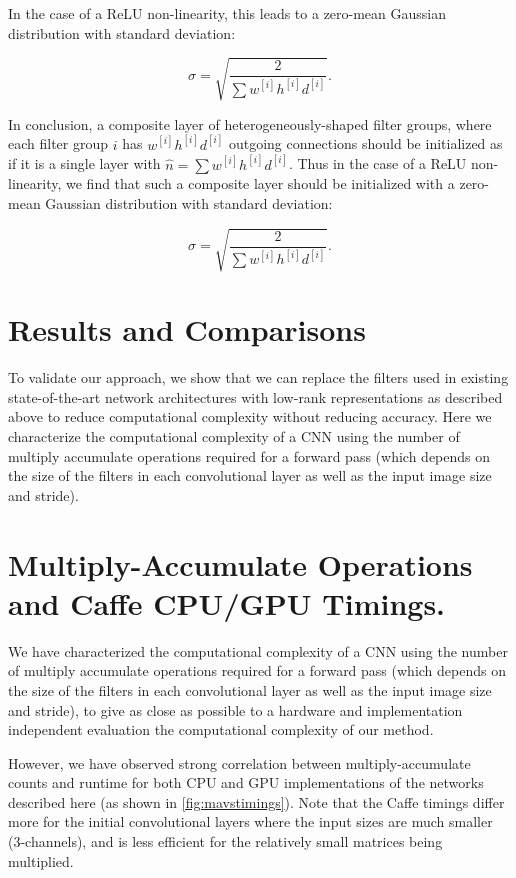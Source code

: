 \documentclass[thesis]{subfiles}
\begin{document}
    In the case of a ReLU non-linearity, this leads to a zero-mean Gaussian distribution with standard deviation:
    
    \begin{equation}
    \sigma = \sqrt{\frac{2}{\sum{ w^{[i]} h^{[i]} d^{[i]}}}}.
    \end{equation}
    
    In conclusion, a composite layer of heterogeneously-shaped filter groups, where each filter group $i$ has $w^{[i]} h^{[i]} d^{[i]}$ outgoing connections should be initialized as if it is a single layer with  $\hat{n} = \sum{ w^{[i]} h^{[i]} d^{[i]}}$. Thus in the case of a ReLU non-linearity, we find that such a composite layer should be initialized with a zero-mean Gaussian distribution with standard deviation:
    
    \begin{equation}
    \sigma = \sqrt{\frac{2}{\sum{ w^{[i]} h^{[i]} d^{[i]}}}}.
    \end{equation}
    
    \section{Results and Comparisons}
    To validate our approach, we show that we can replace the filters used in existing state-of-the-art network architectures with low-rank representations as described above to reduce computational complexity without reducing accuracy. Here we characterize the computational complexity of a CNN using the number of multiply accumulate operations required for a forward pass (which depends on the size of the filters in each convolutional layer as well as the input image size and stride). 
    \section{Multiply-Accumulate Operations and Caffe CPU/GPU Timings.}\label{mavstimings}
    We have characterized the computational complexity of a CNN using the number of multiply accumulate operations required for a forward pass (which depends on the size of the filters in each convolutional layer as well as the input image size and stride), to give as close as possible to a hardware and implementation independent evaluation the computational complexity of our method. 
    
    
    However, we have observed strong correlation between multiply-accumulate counts and runtime for both CPU and GPU implementations of the networks described here (as shown in \cref{fig:mavstimings}). Note that the Caffe timings differ more for the initial convolutional layers where the input sizes are much smaller (3-channels), and  is less efficient for the relatively small matrices being multiplied.
    
\end{document}
